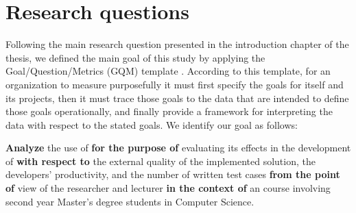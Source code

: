 \newpage
\section{Research questions}
Following the main research question presented in the introduction chapter of the thesis, we defined the main goal of this study by applying the Goal/Question/Metrics (GQM) template \cite{GQM}.
According to this template, for an organization to measure purposefully it must first specify the goals for itself and its projects, then it must trace those goals to the data that are intended to define those goals operationally, and finally provide a framework for interpreting the data with respect to the stated goals.
We identify our goal as follows:

\begin{framed}
\noindent
\textbf{Analyze} the use of \tdd 
\textbf{for the purpose of} evaluating its effects in the development of \ess
\textbf{with respect to} the external quality of the implemented solution, the developers' productivity, and the number of written test cases
\textbf{from the point of} view of the researcher and lecturer 
\textbf{in the context of} an \ess course involving second year Master's degree students in Computer Science.
\end{framed}

